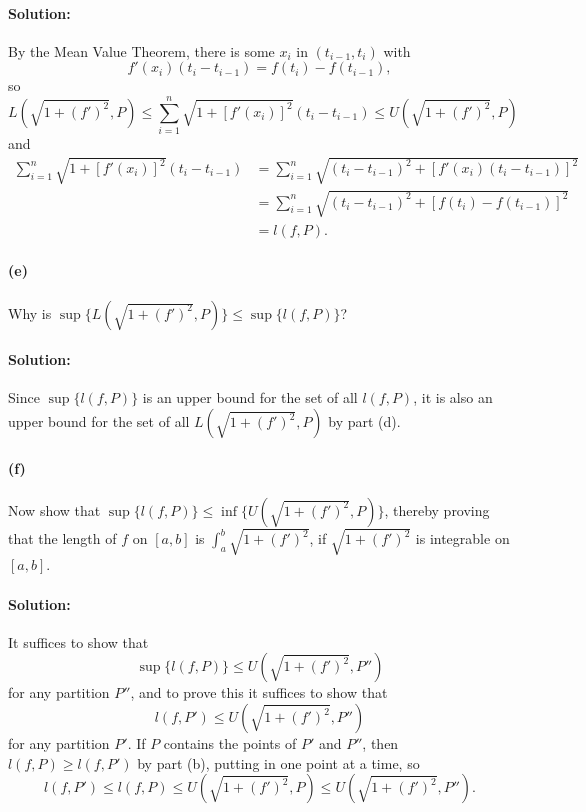 \documentclass{article}
\begin{document}
\paragraph{Solution:} By the Mean Value Theorem, there is some $x_i$ in
$(t_{i - 1}, t_i)$ with \begin{equation*}
  f'(x_i)(t_i - t_{i - 1}) = f(t_i) - f(t_{i - 1}),
\end{equation*} so \begin{equation*}
  L(\sqrt{1 + (f')^2}, P) \leq \sum_{i = 1}^n \sqrt{1 + [f'(x_i)]^2}(t_i -
    t_{i - 1}) \leq U(\sqrt{1 + (f')^2}, P)
\end{equation*} and \begin{align*}
  \sum_{i = 1}^n \sqrt{1 + [f'(x_i)]^2}(t_i - t_{i - 1}) &= \sum_{i = 1}^n
    \sqrt{(t_i - t_{i - 1})^2 + [f'(x_i)(t_i - t_{i - 1})]^2} \\
    &= \sum_{i = 1}^n \sqrt{(t_i - t_{i - 1})^2 + [f(t_i) - f(t_{i - 1})]^2} \\
    &= l(f, P).
\end{align*}

\paragraph{(e)} Why is $\sup\{L(\sqrt{1 + (f')^2}, P)\} \leq \sup\{l(f, P)\}$?

\paragraph{Solution:} Since $\sup\{l(f, P)\}$ is an upper bound for the set of
all $l(f, P)$, it is also an upper bound for the set of all
$L(\sqrt{1 + (f')^2}, P)$ by part (d).

\paragraph{(f)} Now show that $\sup\{l(f, P)\} \leq \inf\{U(\sqrt{1 + (f')^2},
P)\}$, thereby proving that the length of $f$ on $[a, b]$ is $\int_a^b \sqrt{1
+ (f')^2}$, if $\sqrt{1 + (f')^2}$ is integrable on $[a, b]$.

\paragraph{Solution:} It suffices to show that \begin{equation*}
  \sup\{l(f, P)\} \leq U(\sqrt{1 + (f')^2}, P'')
\end{equation*} for any partition $P''$, and to prove this it suffices to show
that \begin{equation*}
  l(f, P') \leq U(\sqrt{1 + (f')^2}, P'')
\end{equation*} for any partition $P'$. If $P$ contains the points of $P'$ and
$P''$, then $l(f, P) \geq l(f, P')$ by part (b), putting in one point at a
time, so \begin{equation*}
  l(f, P') \leq l(f, P) \leq U(\sqrt{1 + (f')^2}, P) \leq U(\sqrt{1 + (f')^2},
    P'').
\end{equation*}
\end{document}
